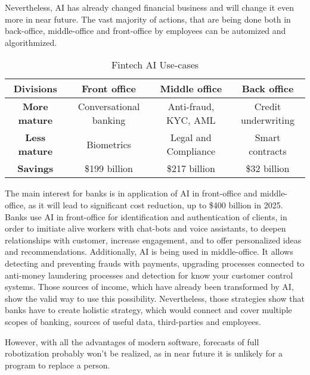 Nevertheless, AI has already changed financial business and will change it even more in near future.
The vast majority of actions, that are being done both in back-office, middle-office and front-office by employees can be automized and algorithmized.

\begin{table}
    \centering
    \caption{Fintech AI Use-cases}
    \begin{tabular}{| c | c | c | c |}
        \hline 
        \textbf{Divisions} &
            Front office & 
            Middle office & 
            Back office \\ \hline 
       
        \textbf{More mature} & 
            Conversational banking & 
            Anti-fraud, KYC, AML & 
            Credit underwriting \\ \hline 
       
        \textbf{Less mature} & 
            Biometrics & 
            Legal and Compliance &
            Smart contracts \\ \hline 
        \textbf{Savings} &
            \$199 billion &
            \$217 billion &
            \$32 billion \\
        \hline 
    \end{tabular}
    \medskip
\end{table}

The main interest for banks is in application of AI in front-office and middle-office, as it will lead to significant cost reduction, up to \$400 billion in 2025.
Banks use AI in front-office for identification and authentication of clients, in order to imitiate alive workers with chat-bots and voice assistants, to deepen relationships with customer, increase engagement, and to offer personalized ideas and recommendations.
Additionally, AI is being used in middle-office.
It allows detecting and preventing frauds with payments, upgrading processes connected to anti-money laundering processes and detection for know your customer control systems.
Those sources of income, which have already been transformed by AI, show the valid way to use this possibility.
Nevertheless, those strategies show that banks have to create holistic strategy, which would connect and cover multiple scopes of banking, sources of useful data, third-parties and employees.
\cite{autonomous_next}

However, with all the advantages of modern software, forecasts of full robotization probably won't be realized, as in near future it is unlikely for a program to replace a person.
\cite{deluxe_mid_size_banks_risk}

